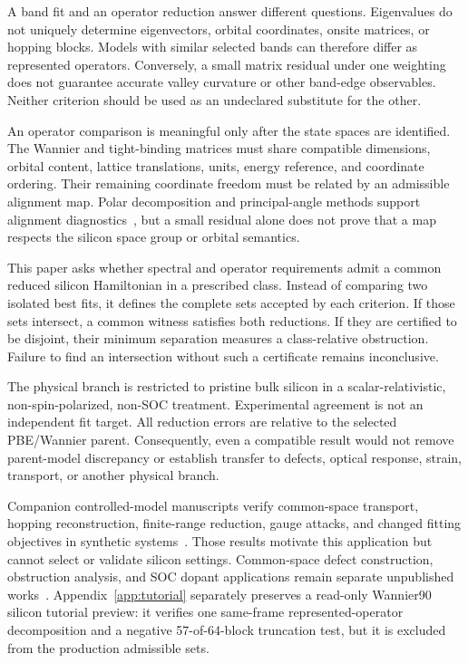 \documentclass[11pt]{article}
\begin{document}
A band fit and an operator reduction answer different questions. Eigenvalues do not uniquely determine eigenvectors, orbital coordinates, onsite matrices, or hopping blocks. Models with similar selected bands can therefore differ as represented operators. Conversely, a small matrix residual under one weighting does not guarantee accurate valley curvature or other band-edge observables. Neither criterion should be used as an undeclared substitute for the other.

An operator comparison is meaningful only after the state spaces are identified. The Wannier and tight-binding matrices must share compatible dimensions, orbital content, lattice translations, units, energy reference, and coordinate ordering. Their remaining coordinate freedom must be related by an admissible alignment map. Polar decomposition and principal-angle methods support alignment diagnostics~\cite{bjorck1973,higham1986}, but a small residual alone does not prove that a map respects the silicon space group or orbital semantics.

This paper asks whether spectral and operator requirements admit a common reduced silicon Hamiltonian in a prescribed class. Instead of comparing two isolated best fits, it defines the complete sets accepted by each criterion. If those sets intersect, a common witness satisfies both reductions. If they are certified to be disjoint, their minimum separation measures a class-relative obstruction. Failure to find an intersection without such a certificate remains inconclusive.

The physical branch is restricted to pristine bulk silicon in a scalar-relativistic, non-spin-polarized, non-SOC treatment. Experimental agreement is not an independent fit target. All reduction errors are relative to the selected PBE/Wannier parent. Consequently, even a compatible result would not remove parent-model discrepancy or establish transfer to defects, optical response, strain, transport, or another physical branch.

Companion controlled-model manuscripts verify common-space transport, hopping
reconstruction, finite-range reduction, gauge attacks, and changed fitting objectives
in synthetic systems~\cite{Ragasa2026a,Ragasa2026b,Ragasa2026c}. Those results motivate
this application but cannot select or validate silicon settings. Common-space defect
construction, obstruction analysis, and SOC dopant applications remain separate
unpublished works~\cite{Ragasa2026e,Ragasa2026f,Ragasa2026g}.
Appendix~\ref{app:tutorial} separately preserves a read-only
Wannier90 silicon tutorial preview: it verifies one same-frame represented-operator
decomposition and a negative 57-of-64-block truncation test, but it is excluded from the
production admissible sets.
\end{document}
